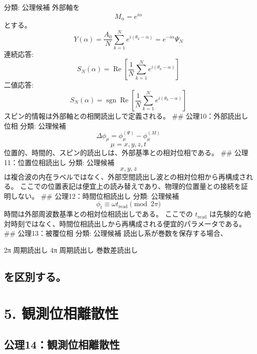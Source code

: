 \documentclass[
  a4paper]{ltjsarticle}
\newenvironment{Shaded}{}{}
\newcommand{\NormalTok}[1]{#1}
\begin{document}
分類: 公理候補 外部軸を \[
M_\alpha=e^{i\alpha}
\] とする。 \[
Y(\alpha)=\frac{A_0}{N}\sum_{k=1}^{N}e^{i(\theta_k-\alpha)}
=e^{-i\alpha}\Psi_N
\] 連続応答: \[
S_N(\alpha)=\operatorname{Re}\left[\frac{1}{N}\sum_{k=1}^{N}e^{i(\theta_k-\alpha)}\right]
\] 二値応答: \[
S_N(\alpha)=\operatorname{sgn}\operatorname{Re}\left[\frac{1}{N}\sum_{k=1}^{N}e^{i(\theta_k-\alpha)}\right]
\] スピン的情報は外部軸との相関読出しで定義される。 \#\#
公理10：外部読出し位相 分類: 公理候補 \[
\Delta\phi_\mu=\phi_\mu^{(\Psi)}-\phi_\mu^{(M)}
\] \[
\mu=x,y,z,t
\] 位置的、時間的、スピン的読出しは、外部基準との相対位相である。 \#\#
公理11：位置位相読出し 分類: 公理候補 \[
x,y,z
\]
は複合波の内在ラベルではなく、外部空間読出し波との相対位相から再構成される。
ここでの位置表記は便宜上の読み替えであり、物理的位置量との接続を証明しない。
\#\# 公理12：時間位相読出し 分類: 公理候補 \[
\phi_t\equiv\omega t_{\mathrm{read}}\pmod{2\pi}
\] 時間は外部周波数基準との相対位相読出しである。 ここでの
\(t_{\mathrm{read}}\)
は先験的な絶対時刻ではなく、時間位相読出しから再構成される便宜的パラメータである。
\#\# 公理13：被覆位相 分類: 公理候補 読出し系が巻数を保存する場合、

\begin{Shaded}
\begin{Highlighting}[]
\NormalTok{2π 周期読出し}
\NormalTok{4π 周期読出し}
\NormalTok{巻数差読出し}
\end{Highlighting}
\end{Shaded}

\subsection{を区別する。}\label{ux3092ux533aux5225ux3059ux308b}

\section{5.
観測位相離散性}\label{ux89b3ux6e2cux4f4dux76f8ux96e2ux6563ux6027}

\subsection{公理14：観測位相離散性}\label{ux516cux740614ux89b3ux6e2cux4f4dux76f8ux96e2ux6563ux6027}
\end{document}
